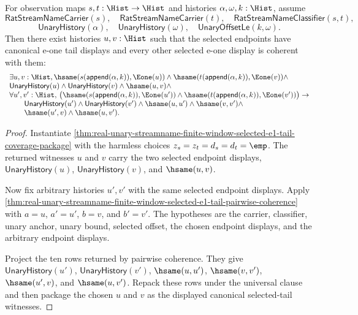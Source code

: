 \begin{theorem}
\label{thm:real-unary-streamname-finite-window-selected-canonical-e1-tail-witness}
For observation maps $s,t:\Hist\to\Hist$ and histories
$\alpha,\omega,k:\Hist$, assume
$$
\mathsf{RatStreamNameCarrier}(s),\quad
\mathsf{RatStreamNameCarrier}(t),\quad
\mathsf{RatStreamNameClassifier}(s,t),
$$
$$
\mathsf{UnaryHistory}(\alpha),\quad
\mathsf{UnaryHistory}(\omega),\quad
\mathsf{UnaryOffsetLe}(k,\omega).
$$
Then there exist histories $u,v:\Hist$ such that the selected endpoints have
canonical e-one tail displays and every other selected e-one display is coherent
with them:
$$
\begin{array}{l}
\exists u,v:\Hist,
\hsame(s(\mathsf{append}(\alpha,k)),\Eone(u))\land
\hsame(t(\mathsf{append}(\alpha,k)),\Eone(v))\land\\
\mathsf{UnaryHistory}(u)\land
\mathsf{UnaryHistory}(v)\land
\hsame(u,v)\land\\
\forall u',v':\Hist,\,
\bigl(\hsame(s(\mathsf{append}(\alpha,k)),\Eone(u'))\land
\hsame(t(\mathsf{append}(\alpha,k)),\Eone(v'))\bigr)\to\\
\qquad
\mathsf{UnaryHistory}(u')\land
\mathsf{UnaryHistory}(v')\land
\hsame(u,u')\land
\hsame(v,v')\land\\
\qquad
\hsame(u',v)\land
\hsame(u,v').
\end{array}
$$
\end{theorem}
\begin{proof}
Instantiate
\autoref{thm:real-unary-streamname-finite-window-selected-e1-tail-coverage-package}
with the harmless choices $z_s=z_t=d_s=d_t=\emp$. The returned witnesses
$u$ and $v$ carry the two selected endpoint displays,
$\mathsf{UnaryHistory}(u)$, $\mathsf{UnaryHistory}(v)$, and $\hsame(u,v)$.

Now fix arbitrary histories $u',v'$ with the same selected endpoint displays.
Apply
\autoref{thm:real-unary-streamname-finite-window-selected-e1-tail-pairwise-coherence}
with $a=u$, $a'=u'$, $b=v$, and $b'=v'$. The hypotheses are the carrier,
classifier, unary anchor, unary bound, selected offset, the chosen endpoint
displays, and the arbitrary endpoint displays.

Project the ten rows returned by pairwise coherence. They give
$\mathsf{UnaryHistory}(u')$, $\mathsf{UnaryHistory}(v')$, $\hsame(u,u')$,
$\hsame(v,v')$, $\hsame(u',v)$, and $\hsame(u,v')$. Repack these rows under the
universal clause and then package the chosen $u$ and $v$ as the displayed
canonical selected-tail witnesses.
\end{proof}

